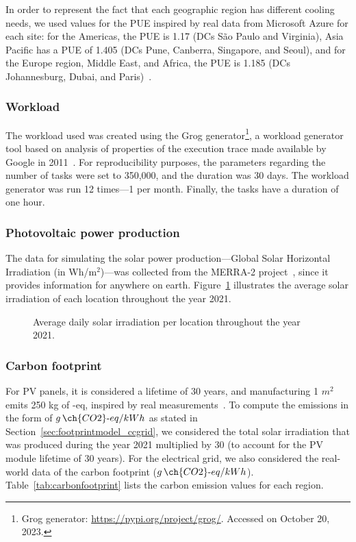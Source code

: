 In order to represent the fact that each geographic region has different cooling needs, we used values for the PUE inspired by real data from Microsoft Azure for each site: for the Americas, the PUE is 1.17 (DCs São Paulo and Virginia), Asia Pacific has a PUE of 1.405 (DCs Pune, Canberra, Singapore, and Seoul), and for the Europe region, Middle East, and Africa, the PUE is 1.185 (DCs Johannesburg, Dubai, and Paris)~\cite{walsh2022_azurepue}.

\subsubsection{Workload}

The workload used was created using the Grog generator\footnote{Grog generator: \url{https://pypi.org/project/grog/}. Accessed on October 20, 2023.},  a workload generator tool based on analysis of properties of the execution trace made available by Google in 2011~\cite{DACOSTA2018_grog}. For reproducibility purposes, the parameters regarding the number of tasks were set to 350,000, and the duration was 30 days. The workload generator was run 12 times---1 per month. Finally, the tasks have a duration of one hour.

\subsubsection{Photovoltaic power production}

The data for simulating the solar power production---Global Solar Horizontal Irradiation (in Wh/m$^{2}$)---was collected from the MERRA-2 project~\cite{GELARO2017MERRA2}, since it provides information for anywhere on earth. Figure~\ref{fig:pv_ghi} illustrates the average solar irradiation of each location throughout the year 2021.

 \begin{figure}[h]
  \centering
   {}
  \caption{Average daily solar irradiation per location throughout the year 2021.}
  \label{fig:pv_ghi}
\end{figure}

\subsubsection{Carbon footprint}

For PV panels, it is considered a lifetime of 30 years, and manufacturing 1 $m^2$ emits 250 kg of -eq, inspired by real measurements~\cite{YUE2014pv_carbon}. To compute the emissions in the form of $g\,\ch{CO2}\text{-}eq/kWh$ as stated in Section~\ref{sec:footprintmodel_ccgrid}, we considered the total solar irradiation that was produced during the year 2021 multiplied by 30 (to account for the PV module lifetime of 30 years). For the electrical grid, we also considered the real-world data of the carbon footprint ($g\,\ch{CO2}\text{-}eq/kWh$). Table~\ref{tab:carbonfootprint} lists the carbon emission values for each region.

